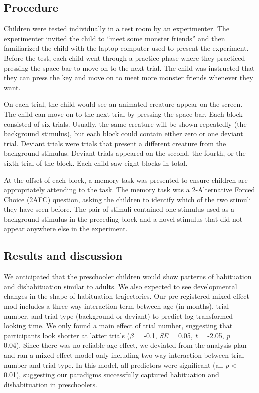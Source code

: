 \documentclass[10pt, letterpaper]{article}
\begin{document}
\hypertarget{procedure}{%
\subsection{Procedure}\label{procedure}}

Children were tested individually in a test room by an experimenter. The
experimenter invited the child to ``meet some monster friends'' and then
familiarized the child with the laptop computer used to present the
experiment. Before the test, each child went through a practice phase
where they practiced pressing the space bar to move on to the next
trial. The child was instructed that they can press the key and move on
to meet more monster friends whenever they want.

On each trial, the child would see an animated creature appear on the
screen. The child can move on to the next trial by pressing the space
bar. Each block consisted of six trials. Usually, the same creature will
be shown repeatedly (the background stimulus), but each block could
contain either zero or one deviant trial. Deviant trials were trials
that present a different creature from the background stimulus. Deviant
trials appeared on the second, the fourth, or the sixth trial of the
block. Each child saw eight blocks in total.

At the offset of each block, a memory task was presented to ensure
children are appropriately attending to the task. The memory task was a
2-Alternative Forced Choice (2AFC) question, asking the children to
identify which of the two stimuli they have seen before. The pair of
stimuli contained one stimulus used as a background stimulus in the
preceding block and a novel stimulus that did not appear anywhere else
in the experiment.

\hypertarget{results-and-discussion}{%
\subsection{Results and discussion}\label{results-and-discussion}}

We anticipated that the preschooler children would show patterns of
habituation and dishabituation similar to adults. We also expected to
see developmental changes in the shape of habituation trajectories. Our
pre-registered mixed-effect mod includes a three-way interaction term
between age (in months), trial number, and trial type (background or
deviant) to predict log-transformed looking time. We only found a main
effect of trial number, suggesting that participants look shorter at
latter trials (\(\beta\) = -0.1, \emph{SE} = 0.05, \emph{t} = -2.05,
\emph{p} = 0.04). Since there was no reliable age effect, we deviated
from the analysis plan and ran a mixed-effect model only including
two-way interaction between trial number and trial type. In this model,
all predictors were significant (all \emph{p} \textless{} 0.01),
suggesting our paradigms successfully captured habituation and
dishabituation in preschoolers.
\end{document}
